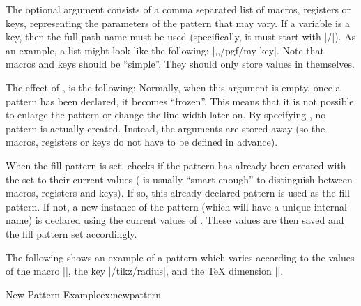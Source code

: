 	The optional argument  consists of a comma
	separated	list of macros,	registers or keys, representing the
	parameters of the pattern that may vary. If a variable is a key,
	then the full path name must be used (specifically, it must start
	with |/|).
	As an example, a list might look like the following:
	|\mymacro,\mydimen,/pgf/my key|. Note that macros and keys should
	be ``simple''. They should only store values in themselves.
	
	The effect of , is the following:
  Normally, when this argument is empty, once a pattern has been
  declared, it becomes ``frozen''. This means that it is not possible
  to enlarge the pattern or change the line width later on.
  By specifying , no pattern is actually created.
  Instead, the arguments are stored away
  (so the macros,	registers or keys do not have to be defined in advance).

  When the fill pattern is set, \pgfname{} checks if the pattern has
  already been created with the  set to their current
  values (\pgfname{} is usually ``smart enough'' to distinguish between
  macros, registers and keys). If so, this already-declared-pattern
  is used as the fill pattern.
  If not, a new instance of the pattern (which will have a
  unique internal name) is declared using the current values of
  . These values are then saved and the fill pattern
  set accordingly.
	
	The following shows an example of a pattern which varies
	according to the values of the macro |\size|, the key |/tikz/radius|,
	and the \TeX{} dimension |\thickness|.

\begin{texexample}{New Pattern Example}{ex:newpattern}
{}
{}
{\pgfpoint{\size}{\size}}
{
  \pgfsetlinewidth{\thickness}
  \pgfpathcircle{}
}
\newdimen\thickness
{}
\end{texexample}



